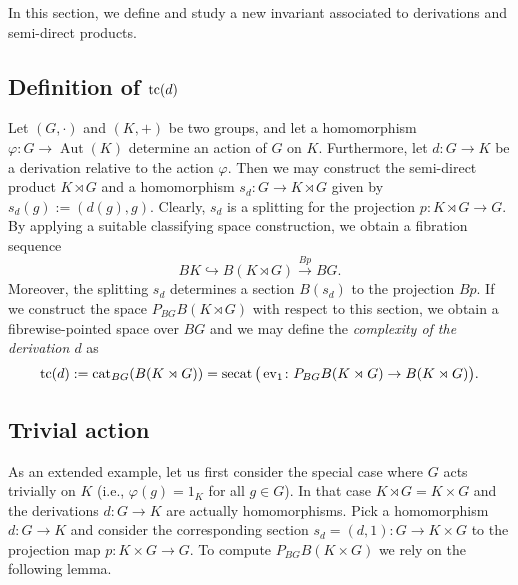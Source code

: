 \documentclass[11pt]{amsart}
\theoremstyle{plain}
\theoremstyle{definition}
\newcommand{\ev}{\mathop{\rm ev}\nolimits}
\newcommand{\cat}{\mathop{\rm cat}\nolimits}
\newcommand{\secat}{\mathop{\rm secat}\nolimits}
\newcommand{\tc}{\mathop{\rm tc}\nolimits}
\DeclareMathOperator{\Aut}{Aut}
\begin{document}
In this section, we define and study a new invariant associated to derivations and semi-direct 
products. 

\subsection{Definition of $\tc(d)$}

Let $(G,\cdot)$ and $(K,+)$ be two groups, and let a homomorphism $\varphi\colon G\to \Aut(K)$ 
determine an action of $G$ on $K$. Furthermore, let $d\colon G\to K$ be a derivation relative to 
the action $\varphi$. Then we may 
construct the semi-direct product $K\rtimes G$ and a homomorphism $s_d\colon G\to K\rtimes G$
given by $s_d(g):=(d(g),g)$. Clearly, $s_d$ is a splitting for the projection 
$p\colon K\rtimes G\to G$. By applying a suitable classifying space construction, we obtain
a fibration sequence
$$BK\hookrightarrow B(K\rtimes G)\stackrel{Bp}{\longrightarrow} BG.$$
Moreover, the splitting $s_d$ determines a section $B(s_d)$ to the projection $Bp$. If we construct 
the space $P_{BG}B(K\rtimes G)$ with respect to this section, we obtain a fibrewise-pointed 
space over $BG$ 
and we may define the \emph{complexity of the derivation $d$} as
$$\tc(d):=\cat_{BG}(B(K\rtimes G))=\secat\big(\ev_1\colon P_{BG}B(K\rtimes G)\to B(K\rtimes G)\big).$$

\subsection{Trivial action} As an extended example, let us first consider the special 
case where $G$ acts trivially on $K$ 
(i.e., $\varphi(g)=1_K$ for all $g\in G$). In that case $K\rtimes G=K\times G$ 
 and the derivations $d\colon G\to K$ are actually homomorphisms. Pick a homomorphism $d\colon G\to K$ 
 and consider the corresponding section $s_d=(d,1)\colon G\to K\times G$ to the projection map 
 $p\colon K\times G\to G$. To compute $P_{BG}B(K\times G)$ we rely on the following lemma.
\end{document}

